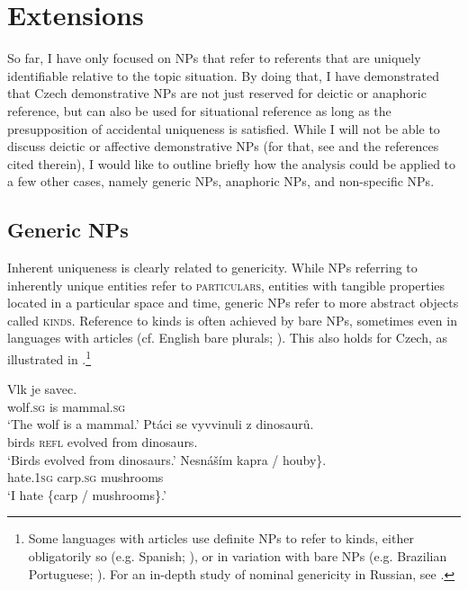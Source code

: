 \documentclass[output=paper,colorlinks,citecolor=brown,newtxmath]{langscibook}
\begin{document}
\section{Extensions}\label{simik:sec:extension}

So far, I have only focused on NPs that refer to referents that are uniquely identifiable relative to the topic situation. By doing that, I have demonstrated that Czech demonstrative NPs are not just reserved for deictic or anaphoric reference, but can also be used for situational reference as long as the presupposition of accidental uniqueness is satisfied. While I will not be able to discuss deictic or affective demonstrative NPs (for that, see \citealt{Simik2016} and the references cited therein), I would like to outline briefly how the analysis could be applied to a few other cases, namely generic NPs, anaphoric NPs, and non-specific NPs.

\subsection{Generic NPs}

Inherent uniqueness is clearly related to genericity. While NPs referring to inherently unique entities refer to \textsc{particulars}, entities with tangible properties located in a particular space and time, generic NPs refer to more abstract objects called \textsc{kinds}. Reference to kinds is often achieved by bare NPs, sometimes even in languages with articles (cf. English bare plurals; \citealt{Carlson1977}). This also holds for Czech, as illustrated in .\footnote{Some languages with articles use definite NPs to refer to kinds, either obligatorily so (e.g. Spanish; \citealt{Borik.Espinal2015}), or in variation with bare NPs (e.g. Brazilian Portuguese; \citealt{Schmitt.Munn1999}). For an in-depth study of nominal genericity in Russian, see \citet{Seresinprep}.}

\ea\label{simik:ex:gen}
\ea\label{simik:ex:gen-a}\gll Vlk je savec.\\
wolf.\textsc{sg} is mammal.\textsc{sg}\\
\glt `The wolf is a mammal.'
\ex\gll Ptáci se vyvvinuli z dinosaurů.\\
birds \textsc{refl} evolved from dinosaurs.\\
\glt `Birds evolved from dinosaurs.'
\ex\gll Nesnáším \minsp{\{} kapra / houby\}.\\
hate.\textsc{1sg} {} carp.\textsc{sg} {} mushrooms\\
\glt `I hate \{carp / mushrooms\}.'
\z\z
\end{document}
